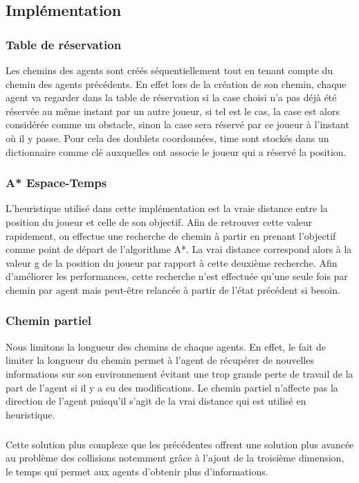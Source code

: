 \documentclass[a4paper, twocolumn]{article}
\begin{document}
			\subsection{Implémentation}
			
			\subsubsection{Table de réservation}
			Les chemins des agents sont créés séquentiellement tout en tenant compte du chemin des agents précédents. En effet lors de la création de son chemin, chaque agent va regarder dans la table de réservation si la case choisi n'a pas déjà été réservée au même instant par un autre joueur, si tel est le cas, la case est alors considérée comme un obstacle, sinon la case sera réservé par ce joueur à l'instant où il y passe. Pour cela des doublets coordonnées, time sont stockés dans un dictionnaire comme clé auxquelles ont associe le joueur qui a réservé la position.
		
			
			\subsubsection{A* Espace-Temps}
			L'heuristique utilisé dans cette implémentation est la vraie distance entre la position du joueur et celle de son objectif. Afin de retrouver cette valeur rapidement, on effectue une recherche de chemin à partir en prenant l'objectif comme point de départ de l'algorithme A*. La vrai distance correspond alors à la valeur g de la position du joueur par rapport à cette deuxième recherche. Afin d'améliorer les performances, cette recherche n'est effectuée qu'une seule fois par chemin par agent mais peut-être relancée à partir de l'état précédent si besoin.

			\subsubsection{Chemin partiel}
			Nous limitons la longueur des chemins de chaque agents. En effet, le fait de limiter la longueur du chemin permet à l'agent de récupérer de nouvelles informations sur son environnement évitant une trop grande perte de travail de la part de l'agent si il y a eu des modifications.
			Le chemin partiel n'affecte pas la direction de l'agent puisqu'il s'agit de la vrai distance qui est utilisé en heuristique.

			\subparagraph{}
			Cette solution plus complexe que les précédentes offrent une solution plus avancée au problème des collisions notemment grâce à l'ajout de la troisième dimension, le temps qui permet aux agents d'obtenir plus d'informations.
\end{document}
